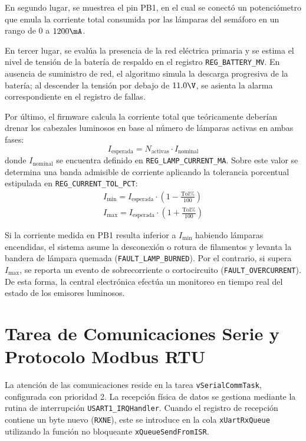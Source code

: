 En segundo lugar, se muestrea el pin PB1, en el cual se conectó un potenciómetro que emula la corriente total consumida
por las lámparas del semáforo en un rango de $0$ a $1200\mA$.

En tercer lugar, se evalúa la presencia de la red eléctrica primaria y se estima el nivel de tensión de la batería de
respaldo en el registro \texttt{REG\_BATTERY\_MV}. En ausencia de suministro de red, el algoritmo simula la descarga
progresiva de la batería; al descender la tensión por debajo de $11.0\V$, se asienta la alarma correspondiente en el
registro de fallas.

Por último, el firmware calcula la corriente total que teóricamente deberían drenar los cabezales luminosos en base
al número de lámparas activas en ambas fases:
\begin{equation}
  I_{\mathrm{esperada}} = N_{\mathrm{activas}} \cdot I_{\mathrm{nominal}}
  \label{eq:corriente_esperada}
\end{equation}
donde $I_{\mathrm{nominal}}$ se encuentra definido en \texttt{REG\_LAMP\_CURRENT\_MA}. Sobre este valor se determina una
banda admisible de corriente aplicando la tolerancia porcentual estipulada en \texttt{REG\_CURRENT\_TOL\_PCT}:
\begin{gather}
  I_{\mathrm{min}} = I_{\mathrm{esperada}} \cdot \left(1 - \frac{\mathrm{Tol}\%}{100}\right) \nonumber \\
  I_{\mathrm{max}} = I_{\mathrm{esperada}} \cdot \left(1 + \frac{\mathrm{Tol}\%}{100}\right)
  \label{eq:banda_tolerancia}
\end{gather}

Si la corriente medida en PB1 resulta inferior a $I_{\mathrm{min}}$ habiendo lámparas encendidas, el sistema asume
la desconexión o rotura de filamentos y levanta la bandera de lámpara quemada (\texttt{FAULT\_LAMP\_BURNED}). Por el
contrario, si supera $I_{\mathrm{max}}$, se reporta un evento de sobrecorriente o cortocircuito
(\texttt{FAULT\_OVERCURRENT}). De esta forma, la central electrónica efectúa un monitoreo en tiempo real del estado de
los emisores luminosos.

\section{Tarea de Comunicaciones Serie y Protocolo Modbus RTU}
\label{sec:modbus_task}

La atención de las comunicaciones reside en la tarea \texttt{vSerialCommTask}, configurada con prioridad 2. La
recepción física de datos se gestiona mediante la rutina de interrupción \texttt{USART1\_IRQHandler}. Cuando el
registro de recepción contiene un byte nuevo (\texttt{RXNE}), este se introduce en la cola \texttt{xUartRxQueue}
utilizando la función no bloqueante \texttt{xQueueSendFromISR}.

